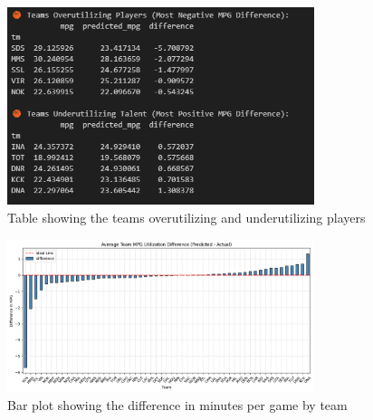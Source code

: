 \documentclass[12pt]{article}
\begin{document}
\begin{figure}[H]
    \centering
    \includegraphics[width=0.8\textwidth]{MM_EP_TEAM_GRAPH.png}
    \caption{Table showing the teams overutilizing and underutilizing players}
    \label{fig:predicted_minutes_distribution}
\end{figure}

\begin{figure}[H]
    \centering
    \includegraphics[width=0.8\textwidth]{MM_EP_TEAM_GRAPHIC_GRAPH.png}
    \caption{Bar plot showing the difference in minutes per game by team}
    \label{fig:team_minutes_analysis}
\end{figure}
\end{document}
